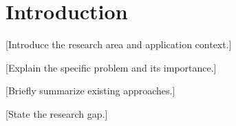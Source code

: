\documentclass[conference]{IEEEtran}
\begin{document}
\section{Introduction}

%

[Introduce the research area and application context.]


%
%

[Explain the specific problem and its importance.]


%
%

[Briefly summarize existing approaches.]


%
%
%
%
%

[State the research gap.]


%
\end{document}
